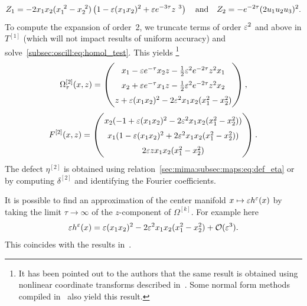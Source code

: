 \begin{equation*}
Z_1 = - 2 x_1 x_2 (x_1^{\ 2} - x_2^{\ 2} ) \left( 1 - \varepsilon (x_1 x_2)^2 + \varepsilon e^{- 3\tau} z^{\ 3} \right) 
\quad \text{and} \quad 
Z_2 = - e^{-2\tau} (2 u_1 u_2 u_3)^2 .
\end{equation*}
%
To compute the expansion of order~2, we truncate terms of order $\varepsilon^2$
and above in $T^{[1]}$ (which will not impact results of uniform accuracy)
and solve~\eqref{subsec:oscill:eq:homol_test}. This yields%
\footnote{It has been pointed out to the authors that the same result is
obtained using nonlinear coordinate transforms described
in~\cite{roberts.2014.model}. Some normal form methods compiled
in~\cite{murdock.2006.normal} also yield this result.}%
\begin{equation*}
\renewcommand{\arraystretch}{1.5}
  \Omega^{[2]}_{\tau}(x,z) = \begin{pmatrix}
  x_1 - \eps e^{-\tau} x_2 z - \frac12 \eps^2 e^{-2\tau} z^2 x_1 \\
  x_2 + \eps e^{-\tau} x_1 z - \frac12 \eps^2 e^{-2\tau} z^2 x_2 \\
  z + \eps (x_1 x_2)^2 - 2 \eps^2 x_1 x_2 (x_1^2 - x_2^2)
  \end{pmatrix}, %
\end{equation*}
$$ 
\renewcommand{\arraystretch}{1.5}
  F^{[2]}(x,z) = \begin{pmatrix}
    x_2 (-1 + \eps (x_1 x_2)^2 - 2 \eps^2 x_1 x_2 (x_1^2 - x_2^2) ) \\
    x_1 (1 - \eps (x_1 x_2)^2 + 2 \eps^2 x_1 x_2 (x_1^2 - x_2^2) ) 
    \\
    2 \eps z x_1 x_2 (x_1^2 - x_2^2)
\end{pmatrix} .
$$
The defect $\eta^{[2]}$ is obtained using
relation~\eqref{sec:mima:subsec:maps:eq:def_eta} or by computing
$\delta^{[2]}$ and identifying the Fourier coefficients. 

\begin{remark}
  It is possible to find an approximation of the center manifold $x
  \mapsto \varepsilon h^{\varepsilon}(x)$ by taking the limit $\tau \rightarrow \infty$ of
  the $z$-component of $\Omega^{[k]}$. For example here 
  $$ 
    \varepsilon h^{\varepsilon}(x) = \varepsilon (x_1 x_2)^2 - 2 \varepsilon^2 x_1 x_2 (x_1^2 - x_2^2) 
    + \mathcal{O}(\varepsilon^3) .
  $$
  This coincides with the results in~\cite{castella.2016.formal}. 
\end{remark}

